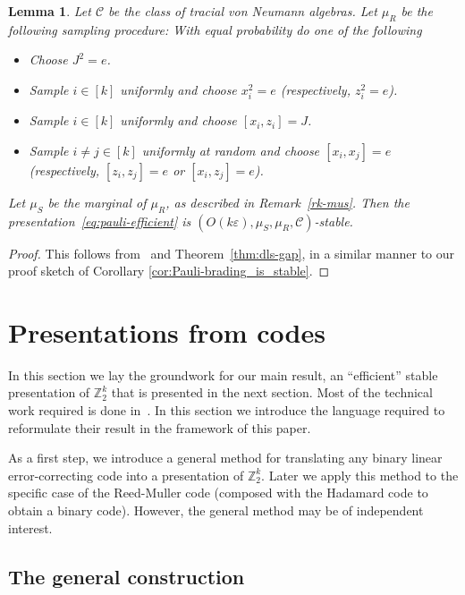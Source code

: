 \documentclass[11pt]{article}
\newtheorem{lemma}[theorem]{Lemma}
\theoremstyle{definition}
\newcommand{\Z}{\ensuremath{\mathbb{Z}}}
\newcommand{\mC}{\ensuremath{\mathcal{C}}}
\newcommand{\eps}{\varepsilon}
\begin{document}
\begin{lemma}\label{lem:eff-pauli}
  Let $\mC$ be the class of tracial von Neumann algebras. Let $\mu_R$ be the following sampling procedure: With equal probability do one of the following
  \begin{itemize}
      \item Choose $J^2=e$.
      \item Sample $i\in [k]$ uniformly and choose $x_i^2=e$ (respectively, $z_i^2=e$).
      \item Sample $i\in [k]$ uniformly and choose $[x_i,z_i]=J$.
      \item Sample $i\neq j\in [k]$ uniformly at random and choose $[x_i,x_j]=e$ (respectively, $[z_i,z_j]=e$ or $[x_i,z_j]=e$).
  \end{itemize}
  Let $\mu_S$ be the marginal of $\mu_R$, as described in Remark~\ref{rk-mus}. Then 
 the presentation~\eqref{eq:pauli-efficient} is $(O(k\eps),\mu_S,\mu_R,\mC)$-stable.
\end{lemma}

\begin{proof}
This follows from~\cite{chao2017overlapping} and Theorem~\ref{thm:dls-gap}, in a similar manner to our proof sketch of Corollary \ref{cor:Pauli-brading_is_stable}.
\end{proof}

\section{Presentations from codes}
\label{sec:pres-codes}

In this section we lay the groundwork for our main result, an ``efficient'' stable presentation of $\Z_2^k$ that is presented in the next section. Most of the technical work required is done in~\cite{ji2020mip}. In this section we introduce the language required to reformulate their result in the framework of this paper. 

As a first step, we introduce a general method for translating any binary linear error-correcting code into a presentation of $\Z_2^k$. Later we apply this method to the specific case of the Reed-Muller code (composed with the Hadamard code to obtain a binary code). However, the general method may be of independent interest. 

\subsection{The general construction}
\end{document}
